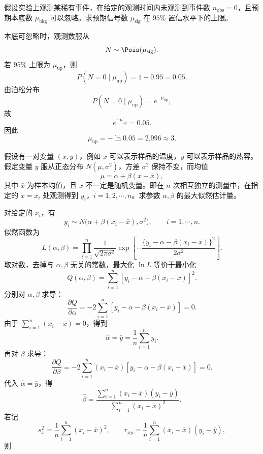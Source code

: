 \begin{question}
假设实验上观测某稀有事件，在给定的观测时间内未观测到事件数 $n_{\mathrm{obs}}=0$，且预期本底数 $\mu_{\mathrm{bkg}}$ 可以忽略。求预期信号数 $\mu_{\mathrm{sig}}$ 在 $95\%$ 置信水平下的上限。
\begin{solution}
本底可忽略时，观测数服从
\[
N\sim \Pois(\mu_{\mathrm{sig}}).
\]
若 $95\%$ 上限为 $\mu_{\mathrm{up}}$，则
\[
P(N=0\mid \mu_{\mathrm{up}})=1-0.95=0.05.
\]
由泊松分布
\[
P(N=0\mid \mu_{\mathrm{up}})=e^{-\mu_{\mathrm{up}}},
\]
故
\[
e^{-\mu_{\mathrm{up}}}=0.05.
\]
因此
\[
\mu_{\mathrm{up}}=-\ln 0.05=2.996\approx 3.
\]
\end{solution}
\end{question}

\begin{question}
假设有一对变量 $(x,y)$，例如 $x$ 可以表示样品的温度，$y$ 可以表示样品的热容。假定变量 $y$ 服从正态分布 $N(\mu,\sigma^2)$，方差 $\sigma^2$ 保持不变，而均值
\[
\mu=\alpha+\beta(x-\bar x),
\]
其中 $\bar x$ 为样本均值，且 $x$ 不一定是随机变量。即在 $n$ 次相互独立的测量中，在指定的 $x=x_i$ 处观测得到 $y_i$，$i=1,2,\cdots,n$。求参数 $\alpha,\beta$ 的最大似然估计量。
\begin{solution}
对给定的 $x_i$，有
\[
y_i\sim N\bigl(\alpha+\beta(x_i-\bar x),\sigma^2\bigr),
\qquad i=1,\cdots,n.
\]
似然函数为
\[
L(\alpha,\beta)=\prod_{i=1}^n
\frac{1}{\sqrt{2\pi\sigma^2}}
\exp\left[-\frac{\{y_i-\alpha-\beta(x_i-\bar x)\}^2}{2\sigma^2}\right].
\]
取对数，去掉与 $\alpha,\beta$ 无关的常数，最大化 $\ln L$ 等价于最小化
\[
Q(\alpha,\beta)=\sum_{i=1}^n\left[y_i-\alpha-\beta(x_i-\bar x)\right]^2.
\]
分别对 $\alpha,\beta$ 求导：
\[
\frac{\partial Q}{\partial\alpha}
=-2\sum_{i=1}^n\left[y_i-\alpha-\beta(x_i-\bar x)\right]=0.
\]
由于 $\sum_{i=1}^n(x_i-\bar x)=0$，得到
\[
\hat\alpha=\bar y=\frac1n\sum_{i=1}^n y_i.
\]
再对 $\beta$ 求导：
\[
\frac{\partial Q}{\partial\beta}
=-2\sum_{i=1}^n(x_i-\bar x)
\left[y_i-\alpha-\beta(x_i-\bar x)\right]=0.
\]
代入 $\hat\alpha=\bar y$，得
\[
\hat\beta=\frac{\sum_{i=1}^n(x_i-\bar x)(y_i-\bar y)}
{\sum_{i=1}^n(x_i-\bar x)^2}.
\]
若记
\[
s_x^2=\frac1n\sum_{i=1}^n(x_i-\bar x)^2,
\qquad
r_{xy}=\frac1n\sum_{i=1}^n(x_i-\bar x)(y_i-\bar y),
\]
则
\end{solution}
\end{question}

